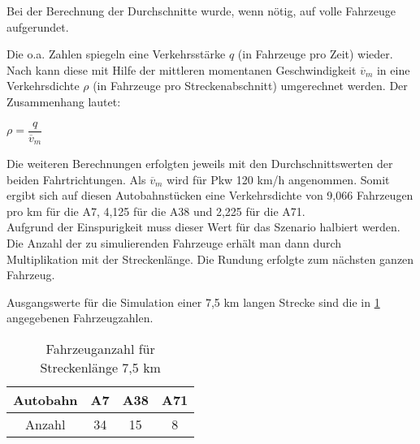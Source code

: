 \noindent
Bei der Berechnung der Durchschnitte wurde, wenn nötig, auf volle Fahrzeuge aufgerundet.

Die o.a. Zahlen spiegeln eine Verkehrsstärke $q$ (in Fahrzeuge pro Zeit) wieder.
Nach \cite{verkehrsplanung} kann diese mit Hilfe der mittleren momentanen Geschwindigkeit $\overline{v}_{m}$ in eine Verkehrsdichte $\rho$ (in Fahrzeuge pro Streckenabschnitt) umgerechnet werden.
Der Zusammenhang lautet: 
\begin{center}
$ \rho = \dfrac{q}{\overline{v}_{m}} $
\end{center}

Die weiteren Berechnungen erfolgten jeweils mit den Durchschnittswerten der beiden Fahrtrichtungen.
Als $\overline{v}_{m}$ wird für Pkw 120 km/h angenommen.
Somit ergibt sich auf diesen Autobahnstücken eine Verkehrsdichte von 9,066 Fahrzeugen pro km für die A7, 4,125 für die A38 und 2,225 für die A71.
\\
Aufgrund der Einspurigkeit muss dieser Wert für das Szenario halbiert werden. 
Die Anzahl der zu simulierenden Fahrzeuge erhält man dann durch Multiplikation mit der Streckenlänge.
Die Rundung erfolgte zum nächsten ganzen Fahrzeug.

Ausgangswerte für die Simulation einer 7,5 km langen Strecke sind die in \cref{tab:fahrzeuge-7ko5km} angegebenen Fahrzeugzahlen. 

\begin{table}[hptb]
\begin{center}
\setlength{\tabcolsep}{0.5em} %
{\renewcommand{\arraystretch}{1.2}%
\begin{tabular}{| c  c  c  c |}
\hline 
\hspace{1em}Autobahn\hspace{1em} & \hspace{1em}A7\hspace{1em} & \hspace{1em}A38\hspace{1em} & \hspace{1em}A71\hspace{1em} \\
\hline 
Anzahl & 34 & 15 & 8 \\ 
\hline 
\end{tabular}
}
\caption{Fahrzeuganzahl für Streckenlänge 7,5 km}
\label{tab:fahrzeuge-7ko5km}
\end{center}
\end{table}

